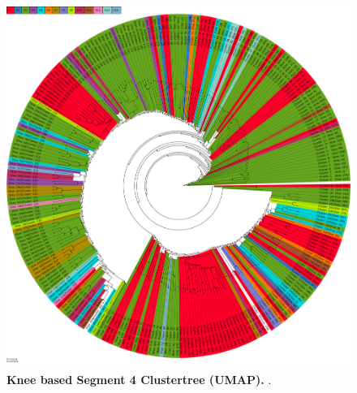 \begin{figure}[!hbt]
    \centering
    \includegraphics[width=\textwidth]{UMAP/Clustertree_Segment_4_H_Knee.pdf}
    \caption[Knee based Segment 4 Clustertree (\Acrshort{UMAP})]{\textbf{Knee based Segment 4 Clustertree (\Acrshort{UMAP}).} .}
    \label{fig:UMAP_Clusteree_Knee_4}
\end{figure}
